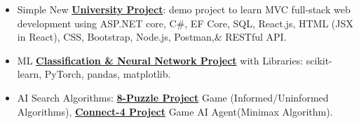 \begin{itemize}[itemsep=0pt, parsep=0pt, topsep=0pt]
  \item {\footnotesize Simple New \textbf{\textcolor{cyan}{\href{https://github.com/AsmaaJAH/simple-university-fullstack-web-project/tree/feature/apply_page}{ University Project}}}: demo project to learn MVC full-stack web development using ASP.NET core, C\#, EF Core, SQL, React.js, HTML (JSX in React), CSS, Bootstrap, Node.js, Postman,\& RESTful API.}
 \end{itemize}



\begin{itemize}[itemsep=0pt, parsep=0pt, topsep=0pt]
  \item{ \footnotesize ML \textbf{\textcolor{cyan}{\href{https://github.com/AsmaaJAH/Data-classifications-and-Neural-Network-using-random-data}{Classification \& Neural Network Project}}} with Libraries: scikit-learn, PyTorch, pandas, matplotlib. }
  \item {\footnotesize AI Search Algorithms: \textbf{\textcolor{cyan}{\href{https://github.com/AsmaaJAH/8_puzzle}{8-Puzzle Project}}} Game (Informed/Uninformed Algorithms), \textbf{\textcolor{cyan}{\href{https://github.com/AsmaaJAH/Connect-4-AI-Agent}{Connect-4 Project}}} Game AI Agent(Minimax Algorithm).}
 \end{itemize}


